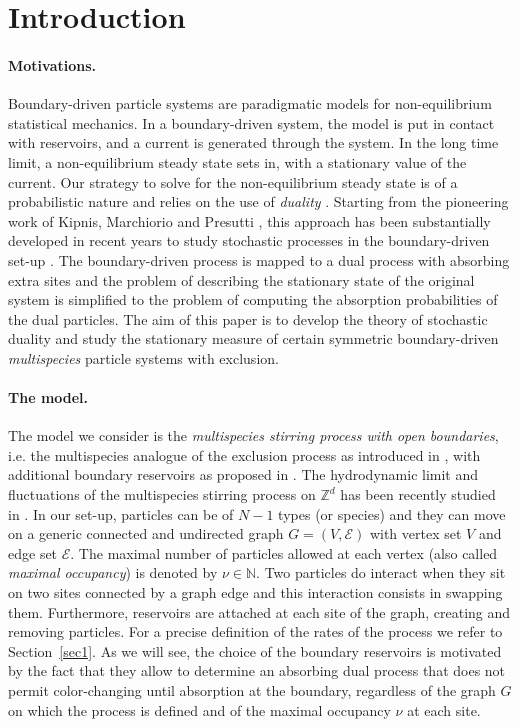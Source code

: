 \documentclass[10pt]{article}
\numberwithin{equation}{section}
\numberwithin{equation}{subsection}
\newcommand{\fra}[1]{\textcolor[rgb]{0,0,1}{#1}}
\begin{document}
 

\newpage
\tableofcontents


 \newpage 
\section{Introduction} 

\paragraph{Motivations.}
Boundary-driven particle systems are paradigmatic models for non-equilibrium statistical mechanics. In a boundary-driven system, the model is put in contact with reservoirs, 
and a current is generated through the system. In the long time limit, a non-equilibrium steady state sets in, with a stationary value of the current.
Our strategy to solve for the non-equilibrium steady state is of a probabilistic nature and relies on the use of {\em duality} \cite{schutzSandow}. Starting from the pioneering work of Kipnis, Marchiorio and Presutti \cite{KMP}, this approach
has been substantially developed in recent years to study stochastic processes in the boundary-driven set-up \cite{giardina2009duality,carinci2013duality}.
The boundary-driven process is mapped to a dual process with absorbing extra sites and the problem of describing the stationary state of the original system
is simplified to the problem of computing the absorption probabilities of the dual particles.  
 The aim of this paper is to develop the theory of stochastic duality and  study the stationary measure of certain symmetric boundary-driven {\em multispecies} particle systems with exclusion.

\paragraph{The model.}
The model we consider is the {\em  multispecies stirring process with open boundaries}, 
i.e. the multispecies analogue of the exclusion process as introduced in \cite{zhou2021orthogonal}, 
with additional boundary reservoirs as proposed in \cite{vanicat2017exact}. 
The hydrodynamic limit and fluctuations of the multispecies stirring process on $\mathbb{Z}^d$
has been recently studied in \cite{casini2023density}.
In our set-up, particles can be of $N-1$ types (or species) and they can move
on a generic connected and undirected graph $G=(V,\mathcal{E})$ with vertex set $V$ and
edge set $\mathcal{E}$. The maximal number of particles allowed at each vertex (also called \textit{maximal occupancy}) is denoted by $\nu\in \mathbb{N}$. 
Two particles do interact when they sit on two sites connected by a graph edge and this interaction consists in swapping them. 
Furthermore, reservoirs are attached at each site of the graph, creating and removing particles. For a precise definition of the rates of the process 
we refer to Section~\ref{sec1}. As we will see, the choice of the boundary reservoirs is motivated by the fact that they allow to determine an absorbing dual process
\fra{that does not permit  color-changing until absorption at the boundary}, 
regardless of the graph $G$ on which the process is defined and of the maximal occupancy $\nu$ at each site.
\end{document}
